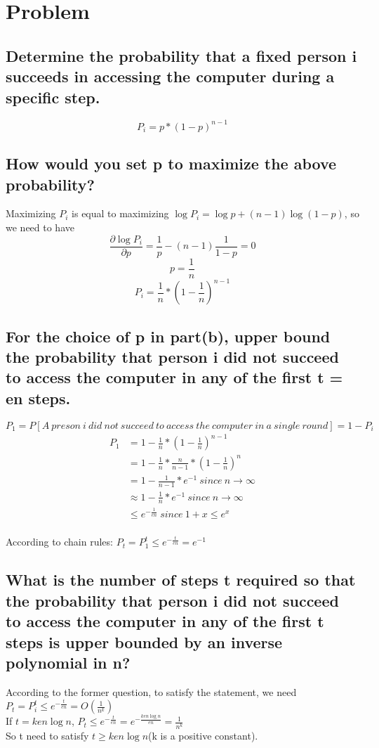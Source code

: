 \documentclass{article}
\begin{document}
\clearpage
\section{Problem \uppercase\expandafter{}}
\subsection{Determine the probability that a fixed person i succeeds in accessing the computer during
a specific step.}
$$P_i = p*(1-p)^{n-1}$$

\subsection{How would you set p to maximize the above probability?}
Maximizing $P_i$ is equal to maximizing $\log P_i= \log p + (n-1)\log(1-p)$, so we need to have
$$\frac{\partial \log P_i}{\partial p}=\frac{1}{p} - (n-1)\frac{1}{1-p}=0$$
$$p=\frac{1}{n}$$
$$P_i=\frac{1}{n}*(1-\frac{1}{n})^{n-1}$$
\subsection{For the choice of p in part(b), upper bound the probability that person i did not succeed
to access the computer in any of the first t = en steps.}
$P_1 = P[A\ preson\ i\ did\ not\ succeed\ to\ access\ the\ computer\ in\ a\ single\ round] = 1 - P_i$\\
\begin{equation}
\begin{aligned}
P_1 &= 1 - \frac{1}{n}*(1-\frac{1}{n})^{n-1}\\
&=1-\frac{1}{n}*\frac{n}{n-1}*(1-\frac{1}{n})^{n}\\
&=1-\frac{1}{n-1}*e^{-1}\ since\ n \to \infty\\
&\approx 1-\frac{1}{n}*e^{-1}\ since\ n \to \infty\\
&\le e^{-{\frac{1}{en}}}\ since\ 1+x \le e^x\\
\end{aligned}
\end{equation}

According to chain rules: $P_t = P_1^t \le e^{-{\frac{t}{en}}}=e^{-1}$
\subsection{What is the number of steps t required so that the probability that person i did not succeed to access the computer in any of the first t steps is upper bounded by an inverse polynomial in n?}
According to the former question, to satisfy the statement, we need $P_t = P_i^t \le e^{-{\frac{t}{en}}} = O(\frac{1}{n^k})$\\
If $t=ken\log n$,  $P_t \le e^{-{\frac{t}{en}}} =e^{-{\frac{ken\log n}{en}}} =\frac{1}{n^k}$\\
So t need to satisfy $t\ge ken\log n$(k is a positive constant).
\end{document}
